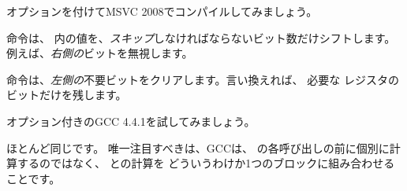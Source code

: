
\Ox オプションを付けてMSVC 2008でコンパイルしてみましょう。




命令は、 \EAX 内の値を、\emph{スキップ}しなければならないビット数だけシフトします。
例えば、\emph{右側の}ビットを無視します。


\AND 命令は、\emph{左側の}不要ビットをクリアします。言い換えれば、
必要な \EAX レジスタのビットだけを残します。




\Othree オプション付きのGCC 4.4.1を試してみましょう。



ほとんど同じです。 
唯一注目すべきは、GCCは、 \printf の各呼び出しの前に個別に計算するのではなく、
との計算を
どういうわけか1つのブロックに組み合わせることです。
